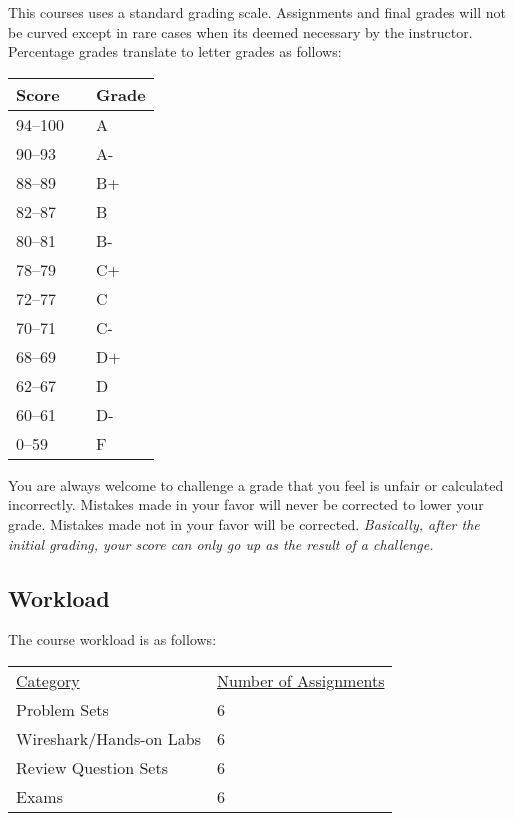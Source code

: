 \documentclass[10pt]{article}
\begin{document}
This courses uses a standard grading scale.  Assignments and final grades will not be curved except in rare cases when its deemed necessary by the instructor.  Percentage grades translate to letter grades as follows:

\begin{center}
\begin{small}
\begin{tabular}{lcl}
Score & & Grade \\ \toprule
94--100 & & A \\
90--93 & & A- \\
88--89 & & B+ \\
82--87 & & B \\
80--81 & & B- \\
78--79 & & C+ \\
72--77 & & C \\
70--71 & & C- \\
68--69 & & D+ \\
62--67 & & D \\
60--61 & & D- \\
0--59 & & F
\end{tabular}
\end{small}
\end{center}


You are always welcome to challenge a grade that you feel is unfair or calculated incorrectly.  Mistakes made in your favor will never be corrected to lower your grade.  Mistakes made not in your favor will be corrected.  \textit{Basically, after the initial grading, your score can only go up as the result of a challenge.}

\subsection{Workload}

The course workload is as follows:
\begin{center}
  \begin{tabular}{ll}
    \underline{Category} & \underline{Number of Assignments} \\
    Problem Sets & 6 \\
    Wireshark/Hands-on Labs & 6 \\
    Review Question Sets & 6 \\
    Exams & 6 \\
  \end{tabular}
\end{center}
\end{document}
